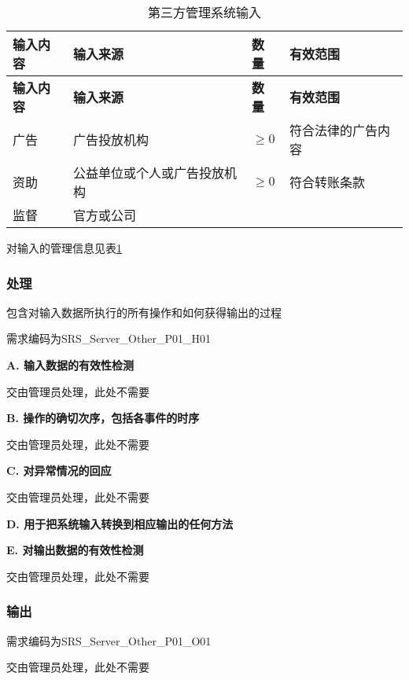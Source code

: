 \begin{longtable}{|p{3cm}|p{4cm}|p{1cm}|p{6cm}|}
\caption{第三方管理系统输入}\label{tab:concrete_other_sys_input} \\
\hline
\textbf{输入内容} & \textbf{输入来源} & \textbf{数量}  & \textbf{有效范围}    \\
\hline
\endfirsthead
\hline
\textbf{输入内容} & \textbf{输入来源} & \textbf{数量}  & \textbf{有效范围}  \\
\hline
\endhead
\hline 
\endfoot
\hline
\endlastfoot
广告 & 广告投放机构 & $\ge 0$ & 符合法律的广告内容 \\
资助 & 公益单位或个人或广告投放机构 & $\ge 0$ & 符合转账条款 \\
监督 & 官方或公司 & &\\
\end{longtable}
对输入的管理信息见表\ref{tab:concrete_other_sys_input}	

\subsubsection{处理}
包含对输入数据所执行的所有操作和如何获得输出的过程

需求编码为SRS\_Server\_Other\_P01\_H01

\textbf{A. 输入数据的有效性检测}

交由管理员处理，此处不需要

\textbf{B. 操作的确切次序，包括各事件的时序}

交由管理员处理，此处不需要

\textbf{C. 对异常情况的回应}

交由管理员处理，此处不需要

\textbf{D. 用于把系统输入转换到相应输出的任何方法}

		
\textbf{E.	对输出数据的有效性检测}

交由管理员处理，此处不需要

\subsubsection{输出}

需求编码为SRS\_Server\_Other\_P01\_O01

交由管理员处理，此处不需要

